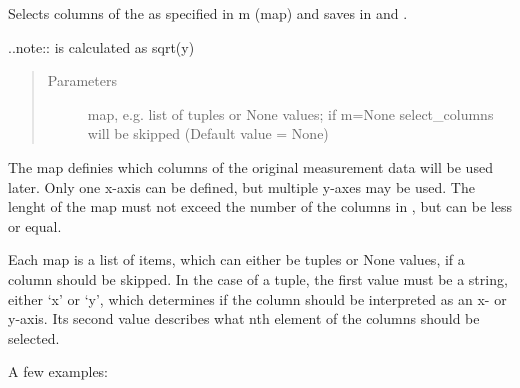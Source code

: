 \documentclass[letterpaper,10pt,english]{sphinxmanual}
\begin{document}
\begin{fulllineitems}
\begin{fulllineitems}
\end{fulllineitems}


\begin{fulllineitems}
\label{\detokenize{measurement:measurement.Measurement.select_columns}}
Selects columns of the  as specified in m (map) and
saves in  and .

..note::  is calculated as sqrt(y)
\begin{quote}\begin{description}
\item[{Parameters}] \leavevmode
{} \textendash{} map, e.g. list of tuples or None values; if m=None
select\_columns will be skipped (Default value = None)

\end{description}\end{quote}

The map  definies which columns of the original measurement
data will be used later. Only one x-axis can be defined, but multiple
y-axes may be used. The lenght of the map must not exceed the number
of the columns in , but can be less or equal.

Each map is a list of items, which can either be tuples or None
values, if a column should be skipped. In the case of a tuple, the
first value must be a string, either ‘x’ or ‘y’, which determines
if the column should be interpreted as an x- or y-axis. Its second
value describes what nth element of the columns should be selected.

A few examples:

\begin{sphinxVerbatim}[commandchars=\\\{\}]
  \PYG{p}{[}\PYG{p}{]}
\end{sphinxVerbatim}


\end{fulllineitems}
\end{fulllineitems}
\end{document}
